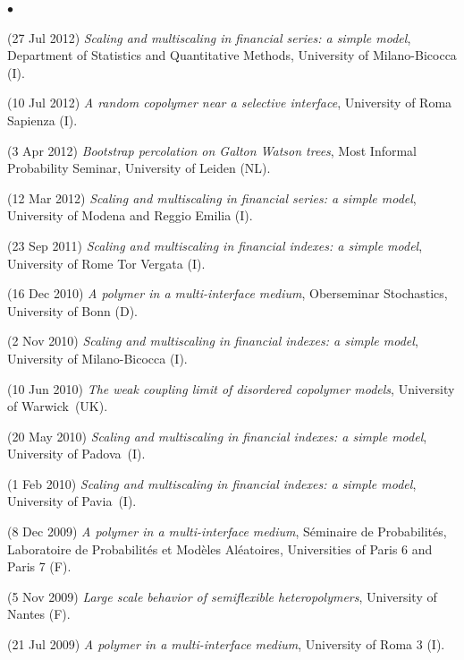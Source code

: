 \documentclass[a4paper,11pt,oneside]{amsart}
\newenvironment{myitemize}{%
\begin{list}{$\bullet$}%
 	{%
	\setlength{\itemsep}{0.3em}%
	\setlength{\topsep}{0.3em}%
	\setlength{\partopsep}{0em}%
	\setlength{\parsep}{0em}%
	\setlength{\parskip}{0em}%
	\setlength\leftmargin{1.5em}%
	\setlength\labelwidth{1.1em}%
	\setlength{\labelsep}{0.4em}%
	}%
	}%
{\end{list}}
\renewenvironment{itemize}{
\begin{myitemize}}%
{\end{myitemize}}
\begin{document}
\begin{itemize}
\item (27 Jul 2012)
\emph{Scaling and multiscaling in financial series: a simple model},
Department of Statistics and Quantitative Methods,
University of Milano-Bicocca (I).

\item (10 Jul 2012)
\emph{A random copolymer near a selective interface},
University of Roma Sapienza (I).

\item (3 Apr 2012)
\emph{Bootstrap percolation on Galton Watson trees},
Most Informal Probability Seminar, University of Leiden (NL).

\item (12 Mar 2012)
\emph{Scaling and multiscaling in financial series: a simple model},
University of Modena and Reggio Emilia (I).

\item (23 Sep 2011)
\emph{Scaling and multiscaling in financial indexes: a simple model},
University of Rome Tor Vergata (I).

\item (16 Dec 2010)
\emph{A polymer in a multi-interface medium},
Oberseminar Stochastics,
University of Bonn (D).

\item (2 Nov 2010)
\emph{Scaling and multiscaling in financial indexes: a simple model},
University of Milano-Bicocca (I).

\item (10 Jun 2010)
\emph{The weak coupling limit of disordered copolymer models},
University of Warwick~(UK).

\item (20 May 2010)
\emph{Scaling and multiscaling in financial indexes: a simple model},
University of Padova~(I).

\item (1 Feb 2010)
\emph{Scaling and multiscaling in financial indexes: a simple model},
University of Pavia~(I).

\item (8 Dec 2009)
\emph{A polymer in a multi-interface medium},
S\'eminaire de Probabilit\'es,
Laboratoire de Probabilit\'es et Mod\`eles Al\'eatoires,
Universities of Paris 6 and Paris 7 (F).

\item (5 Nov 2009)
\emph{Large scale behavior of semiflexible heteropolymers},
University of Nantes (F).

\item (21 Jul 2009)
\emph{A polymer in a multi-interface medium},
University of Roma 3 (I).


\end{itemize}
\end{document}
